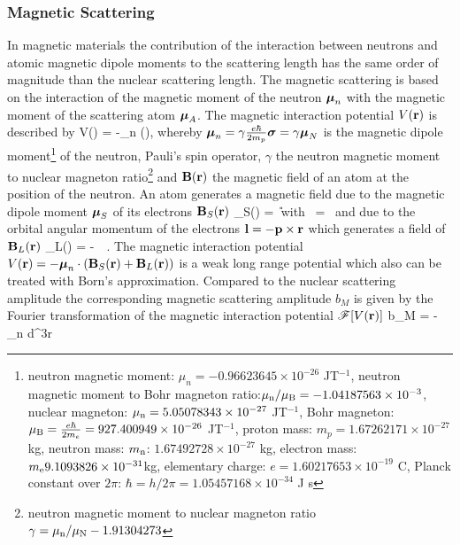 \subsubsection{Magnetic Scattering}
In magnetic materials the contribution of the interaction between neutrons
and atomic magnetic dipole moments to the scattering length has the same order
of magnitude than the nuclear scattering length. The magnetic scattering is based
on the interaction of the magnetic moment of the neutron $\BM{\mu}_n$ with the magnetic
moment of the scattering atom $\BM{\mu}_A$. The magnetic interaction potential $V(\B{r})$
is described by
\BE
 V() = -\BM{\mu}_n \cdot {}(),
\EE
whereby $\BM{\mu}_n=\gamma\frac{e \hbar}{2 m_p}\BM{\sigma}=\gamma\BM{\mu}_N$ is the magnetic dipole
moment\footnote{neutron magnetic moment: $\mu_n=-0.966 236 45 \times 10^{-26}$ JT$^{-1}$,
 neutron magnetic moment to Bohr magneton ratio:$\mu_{\rm n}/\mu_{\rm B}=-1.041 875 63 \times 10^{-3}$,
nuclear magneton: $\mu_{\rm n} = 5.050 783 43 \times 10^{-27}$ JT$^{-1}$,
Bohr magneton: $\mu_{\rm B}=\frac{e\hbar}{2m_e}=927.400 949 \times 10^{-26}$ JT$^{-1}$,
proton mass: $m_p=1.672 621 71 \times 10^{-27}$ kg,
neutron mass: $m_{\rm n}$: $1.674 927 28 \times 10^{-27}$ kg,
electron mass: $m_{\rm e} 9.109 3826 \times 10^{-31}$kg,
elementary charge: $e=1.602 176 53 \times 10^{-19}$ C,
Planck constant over $2\pi$: $\hbar=h/2\pi=1.054 571 68 \times 10^{-34}$ J s}  of
the neutron, \BM{\sigma} Pauli's spin operator, $\gamma$ the
neutron magnetic moment to nuclear magneton
ratio\footnote{neutron magnetic moment to nuclear magneton ratio $\gamma = \mu_{\rm n}/\mu_{\rm N}-1.913 042 73$}
and $\B{B}(\B{r})$ the magnetic field of an atom at the position of the neutron.
An atom generates a magnetic field due to the magnetic dipole moment $\BM{\mu}_S$ of its
electrons $\B{B}_S(\B{r})$
\BE
{}_S() = \BM{\nabla} \times {} \U{~with~}  =
\, 
\EE
and due to the orbital angular momentum of the electrons $\B{l} = -\B{p}\times\B{r}$
which generates a field of $\B{B}_L(\B{r})$
\BE
{}_L() = -\, \,
.
\EE
The magnetic interaction potential
$V(\B{r}) = -\BM{\mu}_n\cdot(\B{B}_S(\B{r})+\B{B}_L(\B{r}))$
is a weak long range potential which also can be treated with
Born's approximation.
Compared to the nuclear scattering amplitude the corresponding magnetic scattering
amplitude $b_M$ is given by the Fourier transformation of the magnetic interaction potential
$\mathcal{F}[V(\B{r})]$
\BE
b_M = -\, \BM{\mu}_n \cdot \int d^3r \,
